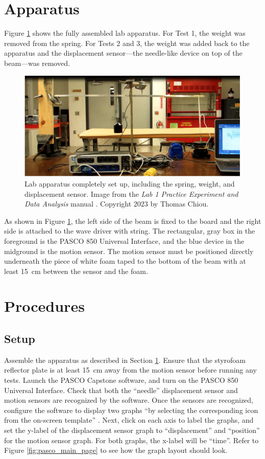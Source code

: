 \documentclass[12 pt]{report}
\begin{document}
\section{Apparatus} \label{apparatus}
Figure \ref{fig:lab_apparatus} shows the fully assembled lab apparatus. For Test 1, the weight was removed from the spring. For Tests 2 and 3, the weight was added back to the apparatus and the displacement sensor---the needle-like device on top of the beam---was removed.

\begin{figure}[htbp]
\centering
\includegraphics[width=6in]{images/Lab_Apparatus}
\caption{Lab apparatus completely set up, including the spring, weight, and displacement sensor. Image from the \textit{Lab 1 Practice Experiment and Data Analysis} manual \cite{lab_procedures}. Copyright 2023 by Thomas Chiou.}
\label{fig:lab_apparatus}
\end{figure}

As shown in Figure \ref{fig:lab_apparatus}, the left side of the beam is fixed to the board and the right side is attached to the wave driver with string. The rectangular, gray box in the foreground is the PASCO 850 Universal Interface, and the blue device in the midground is the motion sensor. The motion sensor must be positioned directly underneath the piece of white foam taped to the bottom of the beam with at least \qty{15}{\cm} between the sensor and the foam.

\section{Procedures} \label{procedures}
\subsection{Setup} \label{procedures-setup}
Assemble the apparatus as described in Section \ref{apparatus}. Ensure that the styrofoam reflector plate is at least \qty{15}{\cm} away from the motion sensor before running any tests. Launch the PASCO Capstone software, and turn on the PASCO 850 Universal Interface. Check that both the ``needle'' displacement sensor and motion sensors are recognized by the software. Once the sensors are recognized, configure the software to display two graphs ``by selecting the corresponding icon from the on-screen template'' \cite{lab_procedures}. Next, click on each axis to label the graphs, and set the y-label of the displacement sensor graph to ``displacement'' and ``position'' for the motion sensor graph. For both graphs, the x-label will be ``time''. Refer to Figure \ref{fig:pasco_main_page} to see how the graph layout should look.
\end{document}
